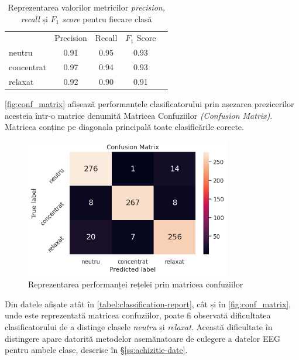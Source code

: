 \begin{table}[ht]
\centering
\caption{Reprezentarea valorilor metricilor \textit{precision, recall} și \textit{$F_1$ score} pentru fiecare clasă}
\label{tabel:classification-report}
\renewcommand{\arraystretch}{1.2}
\begin{tabular}{@{}lcccc@{}}
\cmidrule[\heavyrulewidth]{2-4}
 & Precision & Recall & $F_1$ Score \\ \cmidrule{2-4}
neutru & 0.91 & 0.95 & 0.93 \\
concentrat & 0.97 & 0.94 & 0.93 \\
relaxat & 0.92 & 0.90 & 0.91 \\ \bottomrule
\end{tabular}
\end{table}

\autoref{fig:conf_matrix} afișează performanțele clasificatorului prin așezarea prezicerilor acesteia într-o matrice denumită Matricea Confuziilor \textit{(Confusion Matrix)}. Matricea conține pe diagonala principală toate clasificările corecte.

\begin{figure}[H]
\centering
\includegraphics[width=9cm, keepaspectratio]{fig/cap3/conf_matrix.png}
\caption{Reprezentarea performanței rețelei prin matricea confuziilor}\label{fig:conf_matrix}
\end{figure}

Din datele afișate atât în \autoref{tabel:classification-report}, cât și în \autoref{fig:conf_matrix}, unde este reprezentată matricea confuziilor, poate fi observată dificultatea clasificatorului de a distinge clasele \textit{neutru} și \textit{relaxat}. Această dificultate în distingere apare datorită metodelor asemănatoare de culegere a datelor EEG pentru ambele clase, descrise în \S\ref{ss:achizitie-date}. 
